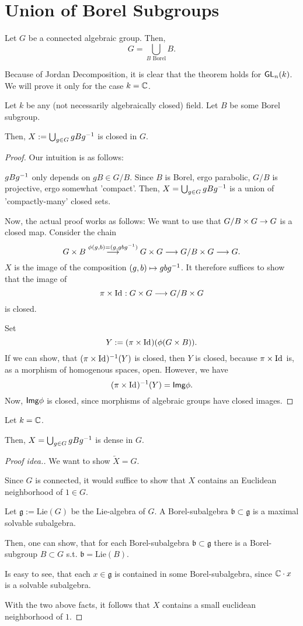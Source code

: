 \section{Union of Borel Subgroups}
\begin{theorem}
	Let $G$ be a connected algebraic group.
	Then,
	\[ G = \bigcup_{B \text{ Borel}} B.  \]
\end{theorem}
Because of Jordan Decomposition, it is clear that the theorem holds for $\textsf{GL}_n(k)$. We will prove it only for the case $k = \mathbb{C}$.

\begin{lemma}
	Let $k$ be any (not necessarily algebraically closed) field. Let $B$ be some Borel subgroup.
	
	Then, $X:= \bigcup_{g \in G} gBg^{-1}$ is closed in $G$.
\end{lemma}
\begin{proof}
	Our intuition is as follows:
	
	$gBg^{-1}$ only depends on $gB \in G/B$. Since $B$ is Borel, ergo parabolic, $G/B$ is projective, ergo somewhat 'compact'. Then, $X= \bigcup_{g \in G} gBg^{-1}$ is a union of 'compactly-many' closed sets.
	
	
	Now, the actual proof works as follows:
	We want to use that $G/B \times G \overset{}{\rightarrow} G$ is a closed map. Consider the chain
	\[ G\times B \overset{ \phi(g,b) = (g, gbg^{-1}) }{\longrightarrow} G \times G \overset{}{\longrightarrow} G / B \times G \overset{}{\longrightarrow} G. \]
	$X$ is the image of the composition $(g,b) \mapsto gbg^{-1}$. It therefore suffices to show that the image of
	\[ \pi \times \text{Id}_{} : G \times G \overset{}{\longrightarrow} G / B \times G \]
	is closed.
	
	Set
	\[ Y:= (\pi \times \text{Id}_{})(\phi(G\times B)). \]
	If we can show, that $(\pi \times \text{Id}_{})^{-1}(Y)$ is closed, then $Y$ is closed, because $\pi \times \text{Id}_{}$ is, as a morphism of homogenous spaces, open. However, we have
	\[ (\pi \times \text{Id}_{})^{-1}(Y) = \textsf{Img} \phi. \]
	Now, $\textsf{Img} \phi$ is closed, since morphisms of algebraic groups have closed images.
\end{proof}

\begin{lemma}
Let $k = \mathbb{C}$.

Then, $X = \bigcup_{g\in G} gBg^{-1}$ is dense in $G$.
\end{lemma}
\begin{proof}[Proof idea.]
	We want to show $\overleftarrow{X} = G$.
	
	Since $G$ is connected, it would suffice to show that $X$ contains an Euclidean neighborhood of $1\in G$.
	
	Let $\mathfrak{g} := \mathrm{Lie}(G)$ be the Lie-algebra of $G$. A Borel-subalgebra $\mathfrak{b} \subset \mathfrak{g}$ is a maximal solvable subalgebra.
	
	Then, one can show, that for each Borel-subalgebra $\mathfrak{b} \subset \mathfrak{g}$ there is a Borel-subgroup $B \subset G$ s.t. $\mathfrak{b} = \mathrm{Lie}(B)$.
	
	Is easy to see, that each $x \in \mathfrak{g}$ is contained in some Borel-subalgebra, since $\mathbb{C} \cdot x$ is a solvable subalgebra.
	
	With the two above facts, it follows that $X$ contains a small euclidean neighborhood of $1$.
\end{proof}